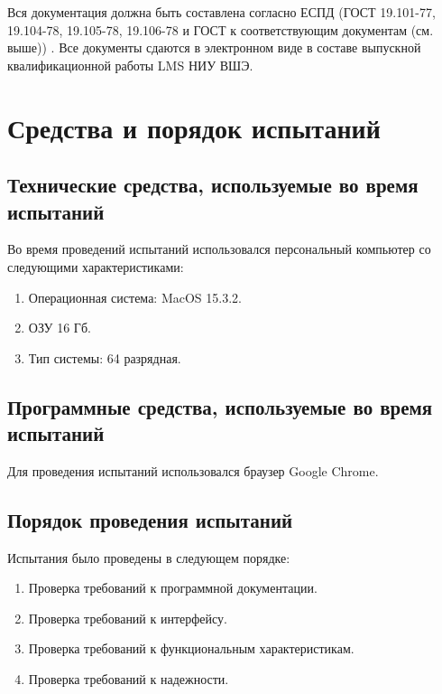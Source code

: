 \documentclass[a4paper,12pt,reqno]{article}
\begin{document}
    \indent
    Вся документация должна быть составлена согласно ЕСПД (ГОСТ 19.101-77, 19.104-78, 19.105-78, 19.106-78 и ГОСТ к соответствующим документам (см. выше)) \cite{TZ:gost0, TZ:gost1, TZ:gost2, TZ:gost3, TZ:gost4, TZ:gost5, TZ:gost6, TZ:gost7, TZ:gost8, TZ:gost9, TZ:gost10, TZ:gost11}. Все документы сдаются в электронном виде в составе выпускной квалификационной работы LMS НИУ ВШЭ.

    \newpage

    \section{Средства и порядок испытаний}

    \subsection{Технические средства, используемые во время испытаний}
    Во время проведений испытаний использовался персональный компьютер со следующими характеристиками:
    \begin{enumerate}
        \item Операционная система: MacOS 15.3.2.
        \item ОЗУ 16 Гб.
        \item Тип системы: 64 разрядная.
    \end{enumerate}

    \subsection{Программные средства, используемые во время испытаний}
    Для проведения испытаний использовался браузер Google Chrome.

    \subsection{Порядок проведения испытаний}
    Испытания было проведены в следующем порядке:
    \begin{enumerate}
        \item Проверка требований к программной документации.
        \item Проверка требований к интерфейсу.
        \item Проверка требований к функциональным характеристикам.
        \item Проверка требований к надежности.
    \end{enumerate}
\end{document}
